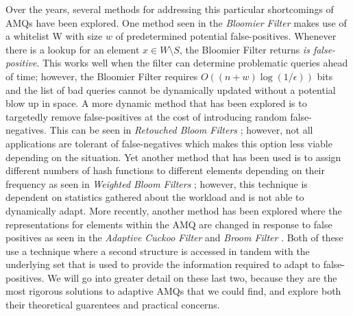 \documentclass[../paper.tex]{subfiles}
\begin{document}
Over the years, several methods for addressing this particular shortcomings of AMQs have been explored.  
One method seen in the {\it Bloomier Filter} \cite{bloomier-filter} makes use of a whitelist 
W with size $w$ of predetermined potential false-positives.  Whenever there is a lookup 
for an element $x \in W \setminus S$, the Bloomier Filter returns \textit{is false-positive}.   
This works well when the filter can determine problematic queries ahead of time; however, the 
Bloomier Filter requires $O((n+w)\log(1/\epsilon))$ bits and the list of bad queries 
cannot be dynamically updated without a potential blow up in space.   A more dynamic 
method that has been explored is to targetedly remove false-positives at the cost of 
introducing random false-negatives.  This can be seen in {\it Retouched Bloom Filters} 
\cite{retouched-filter}; however, not all applications are tolerant of false-negatives 
which makes this option less viable depending on the situation.  Yet another method 
that has been used is to assign different numbers of hash functions to different elements
depending on their frequency as seen in {\it Weighted Bloom Filters} \cite{weighted-filter};
however, this technique is dependent on statistics gathered about the workload and is not able to dynamically
adapt.  More recently, another method has been explored where the representations for 
elements within the AMQ are changed in response to false positives as seen in the {\it 
Adaptive Cuckoo Filter} \cite{adaptive-cuckoo} and {\it Broom Filter} \cite{broom-filter}. 
Both of these use a technique where a second structure is accessed in tandem 
with the underlying set that is used to provide the information required to adapt to 
false-positives.  We will go into greater detail on these last two, because they are the most
rigorous solutions to adaptive AMQs that we could find, and explore both their theoretical guarentees
and practical concerns.  
\end{document}
